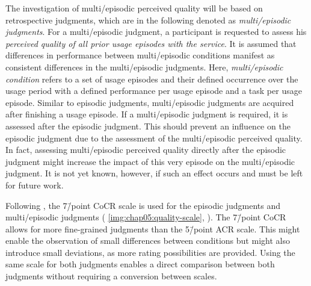 The investigation of multi\-/episodic perceived quality will be based on retrospective judgments, which are in the following denoted as \emph{multi\-/episodic judgments}.
For a multi\-/episodic judgment, a participant is requested to assess his \emph{perceived quality of all prior usage episodes with the service}.
It is assumed that differences in performance between multi\-/episodic conditions manifest as consistent differences in the multi\-/episodic judgments.
Here, \emph{multi\-/episodic condition} refers to a set of usage episodes and their defined occurrence over the usage period with a defined performance per usage episode and a task per usage episode.
Similar to episodic judgments, multi\-/episodic judgments are acquired after finishing a usage episode.
If a multi\-/episodic judgment is required, it is assessed after the episodic judgment.
This should prevent an influence on the episodic judgment due to the assessment of the multi\-/episodic perceived quality.
In fact, assessing multi\-/episodic perceived quality directly after the episodic judgment might increase the impact of this very episode on the multi\-/episodic judgment.
It is not yet known, however, if such an effect occurs and must be left for future work.

Following \citet{moller_single-call_2011}, the 7\=/point \acf{CoCR} scale is used for the episodic judgments and multi\-/episodic judgments (\cf{} \autoref{img:chap05:quality-scale}, ).
The 7\=/point \ac{CoCR} allows for more fine-grained judgments than the 5\=/point \ac{ACR} scale.
This might enable the observation of small differences between conditions but might also introduce small deviations, as more rating possibilities are provided.
Using the same scale for both judgments enables a direct comparison between both judgments without requiring a conversion between scales.


